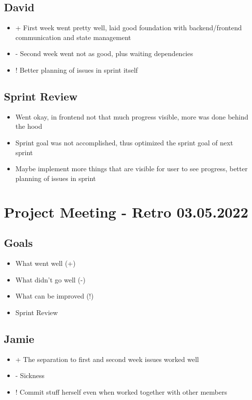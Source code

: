 \subsection{David}
\begin{itemize}
    \item + First week went pretty well, laid good foundation with backend/frontend communication and state management
    \item - Second week went not as good, plus waiting dependencies 
    \item ! Better planning of issues in sprint itself
\end{itemize}

\subsection{Sprint Review}
\begin{itemize}
    \item Went okay, in frontend not that much progress visible, more was done behind the hood
    \item Sprint goal was not accomplished, thus optimized the sprint goal of next sprint
    \item Maybe implement more things that are visible for user to see progress, better planning of issues in sprint
\end{itemize}

\section{Project Meeting - Retro 03.05.2022}

\subsection{Goals}
\begin{itemize}
    \item What went well (+)
    \item What didn't go well (-)
    \item What can be improved (!)
    \item Sprint Review
\end{itemize}

\subsection{Jamie}
\begin{itemize}
    \item + The separation to first and second week issues worked well
    \item - Sickness
    \item ! Commit stuff herself even when worked together with other members
\end{itemize}

